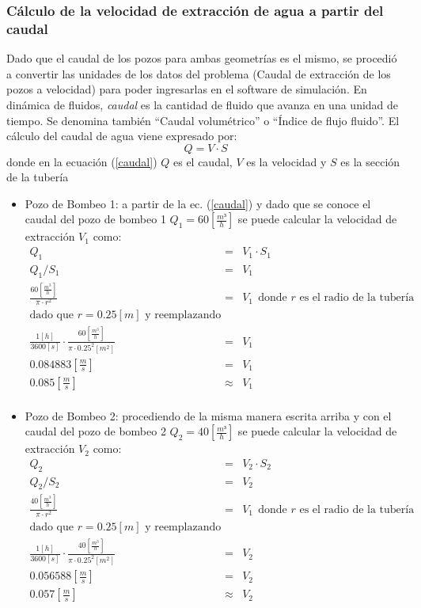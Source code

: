 \documentclass[10pt,a4paper,final]{article}
\begin{document}
\subsubsection{Cálculo de la velocidad de extracción de agua a partir del caudal}
\label{subseccion_transformacion_caudal}
Dado que el caudal de los pozos para ambas geometrías es el mismo, se procedió a convertir las unidades de los datos del problema (Caudal de extracción de los pozos a velocidad) para poder ingresarlas en el software de simulación.
En dinámica de fluidos, \emph{caudal} es la cantidad de fluido que avanza en una unidad de tiempo. Se denomina también ``Caudal volumétrico'' o ``Índice de flujo fluido''. El cálculo del caudal de agua viene expresado por:
\begin{equation}
Q=V \cdot S
\label{caudal}
\end{equation}
donde en la ecuación (\ref{caudal}) $Q$ es el caudal, $V$ es la velocidad y $S$ es la sección de la tubería
%
\begin{itemize}
\item Pozo de Bombeo 1: a partir de la ec. (\ref{caudal}) y dado que se conoce el caudal del pozo de bombeo 1 $Q_1=60 \left[\frac{m³}{h} \right]$ se puede calcular la velocidad de extracción $V_1$ como:\\
\begin{eqnarray*}
Q_1&=&V_1 \cdot S_1 \\
Q_1/S_1&=&V_1 \\
\frac{60 \left[\frac{m^3}{h}\right]}{\pi \cdot r^2} &=&V_1~~\textrm{donde $r$ es el radio de la tubería}\\
\mbox {dado que $r=0.25 \left[m\right]$ y reemplazando}\\
\frac{1 \left[h\right]}{3600 \left[s\right]}\cdot\frac{60 \left[\frac{m^3}{h}\right]}{\pi \cdot 0.25^2 [m^2]}&=&V_1 \\
0.084883 \left[\frac{m}{s}\right]& = & V_1\\
0.085 \left[\frac{m}{s}\right]&\approx& V_1\\
\end{eqnarray*}
\item Pozo de Bombeo 2: procediendo de la misma manera escrita arriba y con el caudal del pozo de bombeo 2 $Q_2=40 \left[\frac{m³}{h} \right]$ se puede calcular la velocidad de extracción $V_2$ como:\\
\begin{eqnarray*}
Q_2&=&V_2 \cdot S_2 \\
Q_2/S_2&=&V_2 \\
\frac{40 \left[\frac{m^3}{h}\right]}{\pi \cdot r^2} &=&V_1~~\textrm{donde $r$ es el radio de la tubería}\\
\mbox {dado que $r=0.25 \left[m\right]$ y reemplazando}\\
\frac{1 \left[h\right]}{3600 \left[s\right]}\cdot\frac{40 \left[\frac{m^3}{h}\right]}{\pi \cdot 0.25^2 [m^2]}&=&V_2 \\
0.056588 \left[\frac{m}{s}\right]& = & V_2\\
0.057 \left[\frac{m}{s}\right]&\approx& V_2\\
\end{eqnarray*}
\end{itemize}
\end{document}
